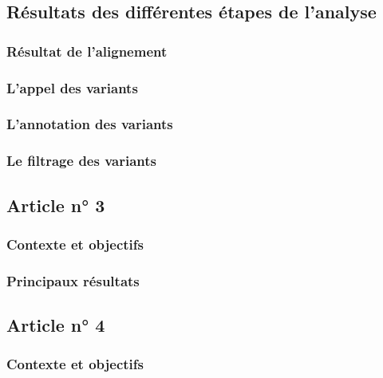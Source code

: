 \documentclass[12pt,twoside]{ugathesis}
\begin{document}
\subsection{Résultats des différentes étapes de
l'analyse}\label{resultats-des-differentes-etapes-de-lanalyse}

\subsubsection{Résultat de l'alignement}\label{resultat-de-lalignement}

\subsubsection{L'appel des variants}\label{lappel-des-variants-1}

\subsubsection{L'annotation des
variants}\label{lannotation-des-variants-1}

\subsubsection{Le filtrage des
variants}\label{le-filtrage-des-variants-2}

\subsection{Article n° 3}\label{article-n-3}

\subsubsection{Contexte et objectifs}\label{contexte-et-objectifs}

\subsubsection{Principaux résultats}\label{principaux-resultats}

\subsection{Article n° 4}\label{article-n-4}

\subsubsection{Contexte et objectifs}\label{contexte-et-objectifs-1}
\end{document}
